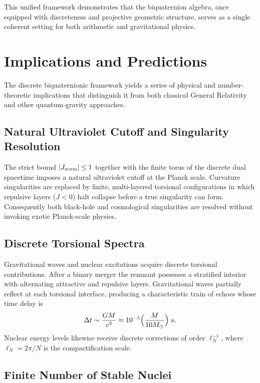 \documentclass[dvipdfmx,a4paper]{article}
\theoremstyle{definition}
\theoremstyle{remark}
\newcommand{\Jnorm}{J_{\rm norm}}
\begin{document}
This unified framework demonstrates that the biquaternion algebra, once equipped with discreteness and projective geometric structure, serves as a single coherent setting for both arithmetic and gravitational physics.

\section{Implications and Predictions}

The discrete biquaternionic framework yields a series of physical and number-theoretic implications that distinguish it from both classical General Relativity and other quantum-gravity approaches.

\subsection{Natural Ultraviolet Cutoff and Singularity Resolution}

The strict bound \( |\Jnorm| \leq 1 \) together with the finite torus of the discrete dual spacetime imposes a natural ultraviolet cutoff at the Planck scale. Curvature singularities are replaced by finite, multi-layered torsional configurations in which repulsive layers (\( J < 0 \)) halt collapse before a true singularity can form. Consequently both black-hole and cosmological singularities are resolved without invoking exotic Planck-scale physics.

\subsection{Discrete Torsional Spectra}

Gravitational waves and nuclear excitations acquire discrete torsional contributions. After a binary merger the remnant possesses a stratified interior with alternating attractive and repulsive layers. Gravitational waves partially reflect at each torsional interface, producing a characteristic train of echoes whose time delay is
\[
\Delta t \sim \frac{GM}{c^3} \approx 10^{-5} \Bigl( \frac{M}{10 M_\odot} \Bigr) \text{ s}.
\]
Nuclear energy levels likewise receive discrete corrections of order \( \ell_N^{-1} \), where \( \ell_N = 2\pi / N \) is the compactification scale.

\subsection{Finite Number of Stable Nuclei}
\end{document}
